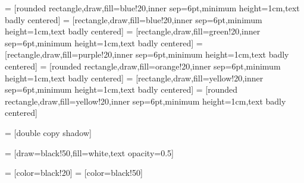 
 = [rounded rectangle,draw,fill=blue!20,inner sep=6pt,minimum height=1cm,text badly centered]
 = [rectangle,draw,fill=blue!20,inner sep=6pt,minimum height=1cm,text badly centered]
 = [rectangle,draw,fill=green!20,inner sep=6pt,minimum height=1cm,text badly centered]
 = [rectangle,draw,fill=purple!20,inner sep=6pt,minimum height=1cm,text badly centered]
 = [rounded rectangle,draw,fill=orange!20,inner sep=6pt,minimum height=1cm,text badly centered]
 = [rectangle,draw,fill=yellow!20,inner sep=6pt,minimum height=1cm,text badly centered]
 = [rounded rectangle,draw,fill=yellow!20,inner sep=6pt,minimum height=1cm,text badly centered]

 = [double copy shadow]

 = [draw=black!50,fill=white,text opacity=0.5]

 = [color=black!20]
 = [color=black!50]


%

